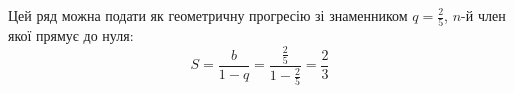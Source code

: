 \documentclass[../rgr_2.tex]{subfiles}
\begin{document}
\Solution


Цей ряд можна подати як геометричну прогресію
зі знаменником $q=\frac{2}{5}$, $n$-й член якої прямує
до нуля:
\begin{equation}
	S=\frac{b}{1-q}=\frac
	{\frac{2}{5}}
	{1-\frac{2}{5}}
	= \frac{2}{3}
\end{equation}

\end{document}
